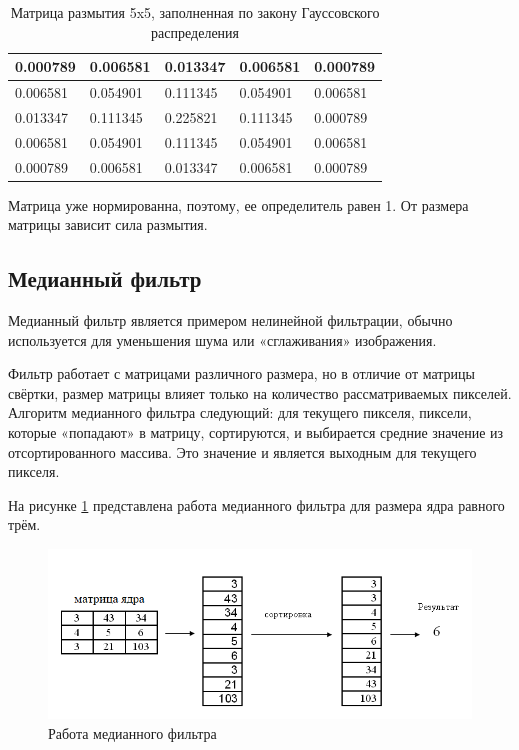\begin{table}[hbtp]
	\centering
	\begin{tabular}{|l|l|l|l|l|}
		\hline
		0.000789 & 0.006581 & 0.013347 & 0.006581 & 0.000789 \\ \hline
		0.006581 & 0.054901 & 0.111345 & 0.054901 & 0.006581 \\ \hline
		0.013347 & 0.111345 & 0.225821 & 0.111345 & 0.000789 \\ \hline
		0.006581 & 0.054901 & 0.111345 & 0.054901 & 0.006581 \\ \hline
		0.000789 & 0.006581 & 0.013347 & 0.006581 & 0.000789 \\ \hline
	\end{tabular}
	\caption{\label{gaussTable} Матрица размытия 5x5, заполненная по закону Гауссовского распределения}
\end{table}

Матрица уже нормированна, поэтому, ее определитель равен 1. От размера матрицы зависит сила размытия.

\subsection{Медианный  фильтр}

Медианный фильтр является примером нелинейной фильтрации, обычно используется для уменьшения шума или «сглаживания» изображения.

Фильтр работает с матрицами различного размера, но в отличие от матрицы свёртки, размер матрицы влияет только на количество рассматриваемых пикселей.
Алгоритм медианного фильтра следующий: для текущего пикселя, пиксели, которые «попадают» в матрицу, сортируются, и выбирается средние значение из отсортированного массива. Это значение и является выходным для текущего пикселя.

На рисунке \ref{fig:spire15} представлена работа медианного фильтра для размера ядра равного трём.

\begin{figure}[hbtp]
	\centering
	\includegraphics[width=\textwidth]{img/image7.png}
	\caption{\label{fig:spire15} Работа медианного фильтра}
\end{figure}

